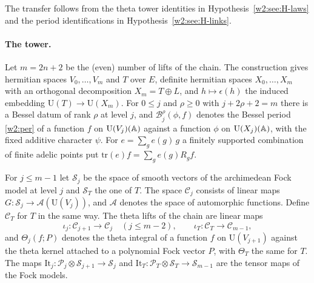 The transfer follows from the theta tower identities in Hypothesis~\ref{w2:see:H-laws} and the period identifications in Hypothesis~\ref{w2:see:H-links}.

\paragraph{The tower.} Let $m=2n+2$ be the (even) number of lifts of the chain. The construction gives hermitian spaces $V_0,\dots,V_m$ and $T$ over $E$, definite hermitian spaces $X_0,\dots,X_m$ with an orthogonal decomposition $X_m=T\oplus L$, and $h\mapsto\epsilon(h)$ the induced embedding $\mathrm U(T)\to\mathrm U(X_m)$. For $0\le j$ and $\rho\ge0$ with $j+2\rho+2=m$ there is a Bessel datum of rank $\rho$ at level $j$, and $\mathcal B^\rho_j(\phi,f)$ denotes the Bessel period \eqref{w2:per} of a function $f$ on $\mathrm U(V_j)(\mathbb A)$ against a function $\phi$ on $\mathrm U(X_j)(\mathbb A)$, with the fixed additive character $\psi$. For $e=\sum_ge(g)\,g$ a finitely supported combination of finite adelic points put $\mathrm{tr}(e)f=\sum_ge(g)R_gf$.

For $j\le m-1$ let $\mathcal S_j$ be the space of smooth vectors of the archimedean Fock model at level $j$ and $\mathcal S_T$ the one of $T$. The space $\mathcal C_j$ consists of linear maps $G\colon\mathcal S_j\to\mathcal A(\mathrm U(V_j))$, and $\mathcal A$ denotes the space of automorphic functions. Define $\mathcal C_T$ for $T$ in the same way. The theta lifts of the chain are linear maps
\[
\iota_j\colon\mathcal C_{j+1}\to\mathcal C_j\quad(j\le m-2),\qquad\iota_T\colon\mathcal C_T\to\mathcal C_{m-1},
\]
and $\Theta_j(f;P)$ denotes the theta integral of a function $f$ on $\mathrm U(V_{j+1})$ against the theta kernel attached to a polynomial Fock vector $P$, with $\Theta_T$ the same for $T$. The maps $\mathrm{It}_j\colon\mathcal P_j\otimes\mathcal S_{j+1}\to\mathcal S_j$ and $\mathrm{It}_T\colon\mathcal P_T\otimes\mathcal S_T\to\mathcal S_{m-1}$ are the tensor maps of the Fock models.

